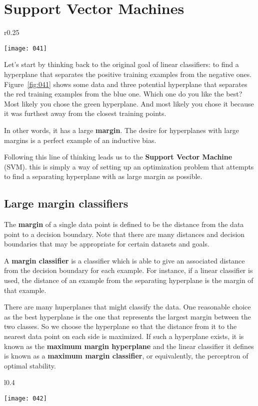 \chapter{Support Vector Machines}

\begin{wrapfigure}{r}{0.25\textwidth}
    \begin{center}
        \texttt{[image: 041]}
        \caption{\(p\)-norms visualized}
        \vspace*{-40pt}
    \end{center}
    \label{fig:041}
\end{wrapfigure}

Let's start by thinking back to the original goal of linear classifiers: to find a hyperplane that separates the positive training examples from the negative ones. Figure~\ref{fig:041} shows some data and three potential hyperplane that separates the red training examples from the blue one. Which one do you like the best? Most likely you chose the green hyperplane. And most likely you chose it because it was furthest away from the closest training points.

In other words, it has a large \textbf{margin}. The desire for hyperplanes with large margins is a perfect example of an inductive bias.

Following this line of thinking leads us to the \textbf{Support Vector Machine} (SVM). this is simply a way of setting up an optimization problem that attempts to find a separating hyperplane with as large margin as possible. 

\section{Large margin classifiers}
The \textbf{margin} of a single data point is defined to be the distance from the data point to a decision boundary. Note that there are many distances and decision boundaries that may be appropriate for certain datasets and goals.

A \textbf{margin classifier} is a classifier which is able to give an associated distance from the decision boundary for each example. For instance, if a linear classifier is used, the distance of an example from the separating hyperplane is the margin of that example.

There are many huperplanes that might classify the data. One reasonable choice as the best hyperplane is the one that represents the largest margin between the two classes. So we choose the hyperplane so that the distance from it to the nearest data point on each side is maximized. If such a hyperplane exists, it is known as the \textbf{maximum margin hyperplane} and the linear classifier it defines is known as a \textbf{maximum margin classifier}, or equivalently, the perceptron of optimal stability.
\begin{wrapfigure}{l}{0.4\textwidth}
    \begin{center}
        \texttt{[image: 042]}
        \caption{Maximum-margin hyperplane and margins for an SVM trained with samples from two classes.}
    \end{center}
    \label{fig:042}
\end{wrapfigure}
